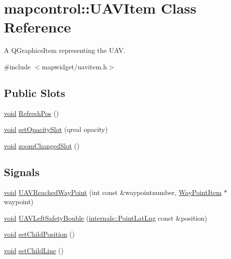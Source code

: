 \hypertarget{classmapcontrol_1_1_u_a_v_item}{\section{mapcontrol\-:\-:\-U\-A\-V\-Item \-Class \-Reference}
\label{classmapcontrol_1_1_u_a_v_item}
}


\-A \-Q\-Graphics\-Item representing the \-U\-A\-V.  




{\ttfamily \#include $<$mapwidget/uavitem.\-h$>$}

\subsection*{\-Public \-Slots}
\begin{DoxyCompactItemize}
\item 
\hyperlink{group___u_a_v_objects_plugin_ga444cf2ff3f0ecbe028adce838d373f5c}{void} \hyperlink{group___o_p_map_widget_gaf033b133e7911ff98ebc1b6977818fc8}{\-Refresh\-Pos} ()
\item 
\hyperlink{group___u_a_v_objects_plugin_ga444cf2ff3f0ecbe028adce838d373f5c}{void} \hyperlink{group___o_p_map_widget_ga3b9172d484d3efba36eeae6bddb3f8f2}{set\-Opacity\-Slot} (qreal opacity)
\item 
\hyperlink{group___u_a_v_objects_plugin_ga444cf2ff3f0ecbe028adce838d373f5c}{void} \hyperlink{group___o_p_map_widget_ga53c572c774d383eb6b672d3ef1da6424}{zoom\-Changed\-Slot} ()
\end{DoxyCompactItemize}
\subsection*{\-Signals}
\begin{DoxyCompactItemize}
\item 
\hyperlink{group___u_a_v_objects_plugin_ga444cf2ff3f0ecbe028adce838d373f5c}{void} \hyperlink{group___o_p_map_widget_gabf2d7a7d3651230d841d2d0e2477bcad}{\-U\-A\-V\-Reached\-Way\-Point} (int const \&waypointnumber, \hyperlink{classmapcontrol_1_1_way_point_item}{\-Way\-Point\-Item} $\ast$waypoint)
\item 
\hyperlink{group___u_a_v_objects_plugin_ga444cf2ff3f0ecbe028adce838d373f5c}{void} \hyperlink{group___o_p_map_widget_ga845584d53f92c89f8f657d7d13630187}{\-U\-A\-V\-Left\-Safety\-Bouble} (\hyperlink{structinternals_1_1_point_lat_lng}{internals\-::\-Point\-Lat\-Lng} const \&position)
\item 
\hyperlink{group___u_a_v_objects_plugin_ga444cf2ff3f0ecbe028adce838d373f5c}{void} \hyperlink{group___o_p_map_widget_ga68e3f8435620e746ad771a99666216dc}{set\-Child\-Position} ()
\item 
\hyperlink{group___u_a_v_objects_plugin_ga444cf2ff3f0ecbe028adce838d373f5c}{void} \hyperlink{group___o_p_map_widget_gafcbd9466c92579c43c5be53eaca75147}{set\-Child\-Line} ()
\end{DoxyCompactItemize}


